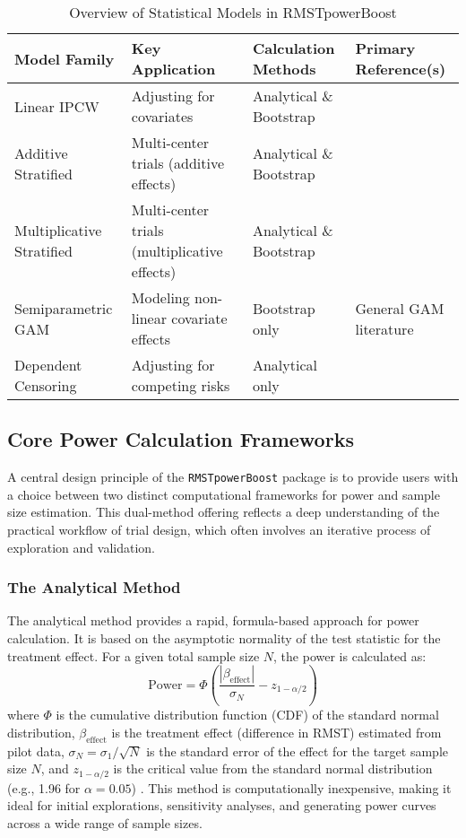 \documentclass[11pt, a4paper]{article}
\begin{document}
\begin{table}[h!]
\centering
\caption{Overview of Statistical Models in RMSTpowerBoost}
\label{tab:model_overview}
\begin{tabular}{@{}llll@{}}
\toprule
\textbf{Model Family} & \textbf{Key Application} & \textbf{Calculation Methods} & \textbf{Primary Reference(s)} \\ \midrule
Linear IPCW & Adjusting for covariates & Analytical \& Bootstrap & \citet{tian2014} \\
Additive Stratified & Multi-center trials (additive effects) & Analytical \& Bootstrap & \citet{zhang2024} \\
Multiplicative Stratified & Multi-center trials (multiplicative effects) & Analytical \& Bootstrap & \citet{wang2019} \\
Semiparametric GAM & Modeling non-linear covariate effects & Bootstrap only & General GAM literature \\
Dependent Censoring & Adjusting for competing risks & Analytical only & \citet{wang2018} \\ \bottomrule
\end{tabular}
\end{table}

\subsection{Core Power Calculation Frameworks}
A central design principle of the \texttt{RMSTpowerBoost} package is to provide users with a choice between two distinct computational frameworks for power and sample size estimation. This dual-method offering reflects a deep understanding of the practical workflow of trial design, which often involves an iterative process of exploration and validation.

\subsubsection{The Analytical Method}
The analytical method provides a rapid, formula-based approach for power calculation. It is based on the asymptotic normality of the test statistic for the treatment effect. For a given total sample size $N$, the power is calculated as:
\begin{equation}
\text{Power} = \Phi\left( \frac{|\beta_{\text{effect}}|}{\sigma_N} - z_{1-\alpha/2} \right)
\end{equation}
where $\Phi$ is the cumulative distribution function (CDF) of the standard normal distribution, $\beta_{\text{effect}}$ is the treatment effect (difference in RMST) estimated from pilot data, $\sigma_N = \sigma_1 / \sqrt{N}$ is the standard error of the effect for the target sample size $N$, and $z_{1-\alpha/2}$ is the critical value from the standard normal distribution (e.g., 1.96 for $\alpha=0.05$) \cite{[1]}. This method is computationally inexpensive, making it ideal for initial explorations, sensitivity analyses, and generating power curves across a wide range of sample sizes.
\end{document}
